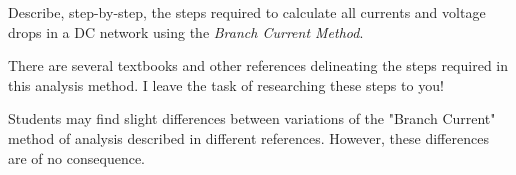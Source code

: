 

Describe, step-by-step, the steps required to calculate all currents and voltage drops in a DC network using the {\it Branch Current Method}.







There are several textbooks and other references delineating the steps required in this analysis method.  I leave the task of researching these steps to you!







Students may find slight differences between variations of the "Branch Current" method of analysis described in different references.  However, these differences are of no consequence.



